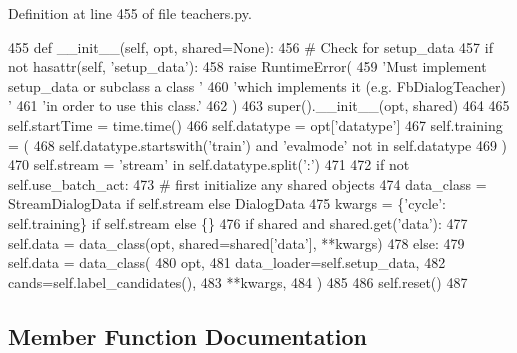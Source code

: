 Definition at line 455 of file teachers.\+py.


\begin{DoxyCode}
455     \textcolor{keyword}{def }\_\_init\_\_(self, opt, shared=None):
456         \textcolor{comment}{# Check for setup\_data}
457         \textcolor{keywordflow}{if} \textcolor{keywordflow}{not} hasattr(self, \textcolor{stringliteral}{'setup\_data'}):
458             \textcolor{keywordflow}{raise} RuntimeError(
459                 \textcolor{stringliteral}{'Must implement setup\_data or subclass a class '}
460                 \textcolor{stringliteral}{'which implements it (e.g. FbDialogTeacher) '}
461                 \textcolor{stringliteral}{'in order to use this class.'}
462             )
463         super().\_\_init\_\_(opt, shared)
464 
465         self.startTime = time.time()
466         self.datatype = opt[\textcolor{stringliteral}{'datatype'}]
467         self.training = (
468             self.datatype.startswith(\textcolor{stringliteral}{'train'}) \textcolor{keywordflow}{and} \textcolor{stringliteral}{'evalmode'} \textcolor{keywordflow}{not} \textcolor{keywordflow}{in} self.datatype
469         )
470         self.stream = \textcolor{stringliteral}{'stream'} \textcolor{keywordflow}{in} self.datatype.split(\textcolor{stringliteral}{':'})
471 
472         \textcolor{keywordflow}{if} \textcolor{keywordflow}{not} self.use\_batch\_act:
473             \textcolor{comment}{# first initialize any shared objects}
474             data\_class = StreamDialogData \textcolor{keywordflow}{if} self.stream \textcolor{keywordflow}{else} DialogData
475             kwargs = \{\textcolor{stringliteral}{'cycle'}: self.training\} \textcolor{keywordflow}{if} self.stream \textcolor{keywordflow}{else} \{\}
476             \textcolor{keywordflow}{if} shared \textcolor{keywordflow}{and} shared.get(\textcolor{stringliteral}{'data'}):
477                 self.data = data\_class(opt, shared=shared[\textcolor{stringliteral}{'data'}], **kwargs)
478             \textcolor{keywordflow}{else}:
479                 self.data = data\_class(
480                     opt,
481                     data\_loader=self.setup\_data,
482                     cands=self.label\_candidates(),
483                     **kwargs,
484                 )
485 
486         self.reset()
487 
\end{DoxyCode}


\subsection{Member Function Documentation}
\mbox{\label{classparlai_1_1core_1_1teachers_1_1DialogTeacher_a1988d984bf87370e9a9e58c9b8ca67a8}} 
